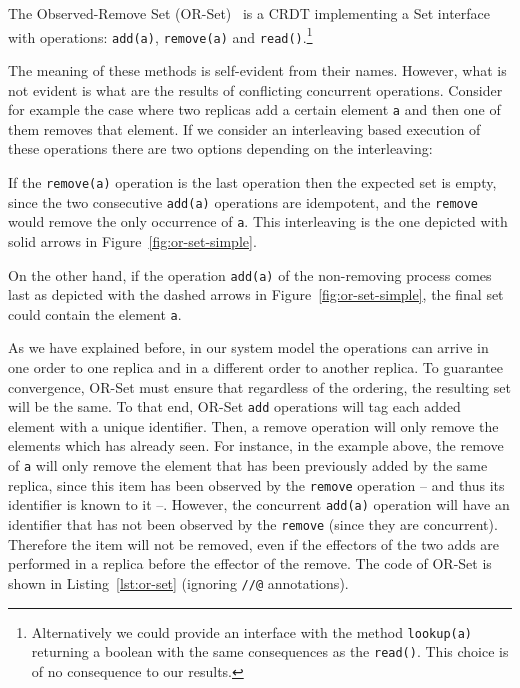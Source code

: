 The Observed-Remove Set (OR-Set)~\cite{ShapiroPBZ11} is a CRDT
implementing a Set interface with operations: \lstinline|add(a)|,
\lstinline|remove(a)| and \lstinline|read()|.\footnote{Alternatively
  we could provide an interface with the method \lstinline|lookup(a)|
  returning a boolean with the same consequences as the
  \lstinline|read()|.
  This choice is of no consequence to our results.}
%

The meaning of these methods is self-evident from their names.
%
However, what is not evident is what are the results of conflicting
concurrent operations.
%
Consider for example the case where two replicas add a certain element
\lstinline|a| and then one of them removes that element.
%
If we consider an interleaving based execution of these operations
there are two options depending on the interleaving:
\begin{inparaenum}[i)]
\item If the \lstinline|remove(a)| operation is the last operation
  then the expected set is empty, since the two consecutive
  \lstinline|add(a)| operations are idempotent, and the
  \lstinline|remove| would remove the only occurrence of
  \lstinline|a|. This interleaving is the one depicted with solid
  arrows in Figure~\ref{fig:or-set-simple}.
\item On the other hand, if the operation \lstinline|add(a)| of the
  non-removing process comes last as depicted with the dashed arrows
  in Figure~\ref{fig:or-set-simple}, the final set could contain the
  element \lstinline|a|.
\end{inparaenum}
As we have explained before, in our system model the operations can
arrive in one order to one replica and in a different order to another
replica.
%
To guarantee convergence, OR-Set must ensure that regardless of the
ordering, the resulting set will be the same.
%
To that end, OR-Set \lstinline|add| operations will tag each added
element with a unique identifier.
%
Then, a remove operation will only remove the elements which has
already seen.
%
For instance, in the example above, the remove of \lstinline|a| will
only remove the element that has been previously added by the same
replica, since this item has been observed by the \lstinline|remove|
operation -- and thus its identifier is known to it --. However, the
concurrent \lstinline|add(a)| operation will have an identifier that
has not been observed by the \lstinline|remove| (since they are
concurrent).
%
Therefore the item will not be removed, even if the
effectors of the two adds are performed in a replica before the effector
of the remove.
%
The code of OR-Set is shown in Listing~\ref{lst:or-set} (ignoring
\lstinline|//@| annotations). 

